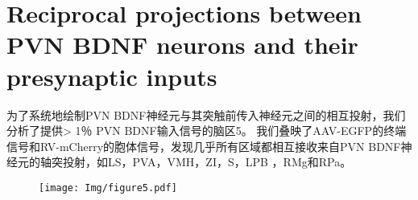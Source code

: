 \section{Reciprocal projections between PVN BDNF neurons and their presynaptic inputs}
为了系统地绘制PVN BDNF神经元与其突触前传入神经元之间的相互投射，我们分析了提供> 1％ PVN BDNF输入信号的脑区\figurename{5}。 我们叠映了AAV-EGFP的终端信号和RV-mCherry的胞体信号，发现几乎所有区域都相互接收来自PVN BDNF神经元的轴突投射，如LS，PVA，VMH，ZI，S，LPB ，RMg和RPa。




\begin{figure}[!htbp]
    \centering
    \texttt{[image: Img/figure5.pdf]}
    \label{fig:figure5}
\end{figure}